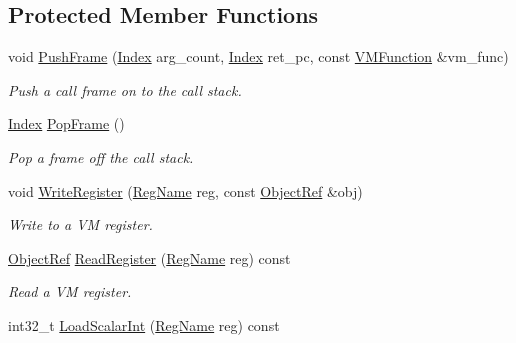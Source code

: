 \subsection*{Protected Member Functions}
\begin{DoxyCompactItemize}
\item 
void \hyperlink{classtvm_1_1runtime_1_1vm_1_1VirtualMachine_a05f2bc216da23c035522d5dde356a920}{Push\+Frame} (\hyperlink{namespacetvm_1_1runtime_1_1vm_a3597867d2db714bf760876a23d6b7d3d}{Index} arg\+\_\+count, \hyperlink{namespacetvm_1_1runtime_1_1vm_a3597867d2db714bf760876a23d6b7d3d}{Index} ret\+\_\+pc, const \hyperlink{structtvm_1_1runtime_1_1vm_1_1VMFunction}{V\+M\+Function} \&vm\+\_\+func)
\begin{DoxyCompactList}\small\item\em Push a call frame on to the call stack. \end{DoxyCompactList}\item 
\hyperlink{namespacetvm_1_1runtime_1_1vm_a3597867d2db714bf760876a23d6b7d3d}{Index} \hyperlink{classtvm_1_1runtime_1_1vm_1_1VirtualMachine_a5a60fe06f720e26c749a80211f1ee620}{Pop\+Frame} ()
\begin{DoxyCompactList}\small\item\em Pop a frame off the call stack. \end{DoxyCompactList}\item 
void \hyperlink{classtvm_1_1runtime_1_1vm_1_1VirtualMachine_a670a5e3f3d9c22bb822efface955bf17}{Write\+Register} (\hyperlink{namespacetvm_1_1runtime_1_1vm_a3bbbf700719e9dc3dda2bc25210c18ae}{Reg\+Name} reg, const \hyperlink{classtvm_1_1runtime_1_1ObjectRef}{Object\+Ref} \&obj)
\begin{DoxyCompactList}\small\item\em Write to a VM register. \end{DoxyCompactList}\item 
\hyperlink{classtvm_1_1runtime_1_1ObjectRef}{Object\+Ref} \hyperlink{classtvm_1_1runtime_1_1vm_1_1VirtualMachine_a75220f7f8173d1d43502ab8198a7ebb3}{Read\+Register} (\hyperlink{namespacetvm_1_1runtime_1_1vm_a3bbbf700719e9dc3dda2bc25210c18ae}{Reg\+Name} reg) const 
\begin{DoxyCompactList}\small\item\em Read a VM register. \end{DoxyCompactList}\item 
int32\+\_\+t \hyperlink{classtvm_1_1runtime_1_1vm_1_1VirtualMachine_a9ce5f01c75078e6ea312500e20385999}{Load\+Scalar\+Int} (\hyperlink{namespacetvm_1_1runtime_1_1vm_a3bbbf700719e9dc3dda2bc25210c18ae}{Reg\+Name} reg) const 

\end{DoxyCompactItemize}
